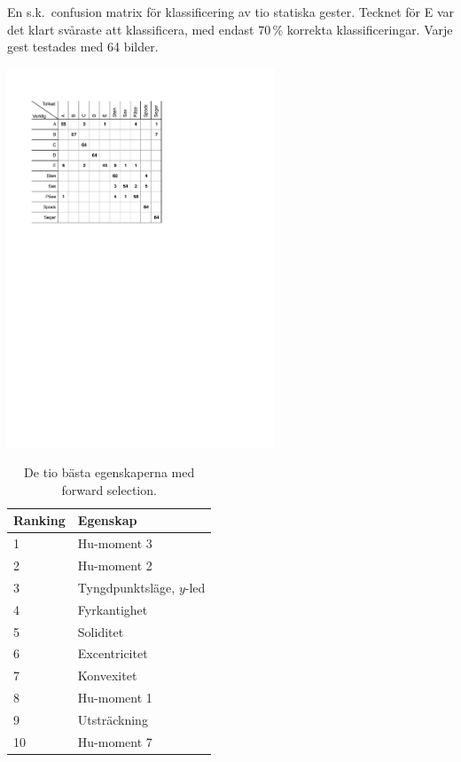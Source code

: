 \documentclass[../rapport_MVEX01-11-05]{subfiles}
\begin{document}
\begin{table}[tbp]
	  \centering
		\caption{En s.k.~confusion matrix för klassificering
                  av tio statiska gester. Tecknet för E var det klart
                  svåraste att klassificera, med endast 70\,\%
                  korrekta klassificeringar. Varje gest testades med
                  64 bilder.}
		\label{tab:tolkningsmatris}
    \includegraphics[trim=2cm 16cm 8cm 2.5cm,clip=true,width=8cm]{bilder/tolkningsmatris.pdf}
\end{table}

\begin{table}[tb]
	\centering
	\caption{De tio bästa egenskaperna med forward selection.}
	
	\label{tab:bestfeatsfwd}
	\begin{tabular}{ll}
		\toprule
		Ranking & Egenskap \\
		\midrule
		1 & Hu-moment 3 \\
		2 & Hu-moment 2 \\
		3 & Tyngdpunktsläge, $y$-led \\
		4 & Fyrkantighet \\
		5 & Soliditet \\
		6 & Excentricitet \\
		7 & Konvexitet \\
		8 & Hu-moment 1 \\
		9 & Utsträckning \\
		10 & Hu-moment 7 \\
		\bottomrule
	\end{tabular}
\end{table}
\end{document}
